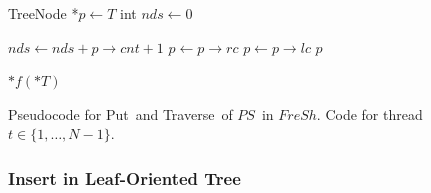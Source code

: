 \documentclass[a4paper,11pt,twoside,openany]{book}
\newcommand{\Put}{\mbox{\sc Put}}
\newcommand{\Traverse}{\mbox{\sc Traverse}}
\newcommand{\PS}{\mbox{$\mathit{PS}$}}
\newcommand{\Fresh}{\mbox{$\mathit{FreSh}$}}
\begin{document}
\begin{algorithm}[htbp]
\begin{algorithmic}[1]
    \vspace*{1mm}
      \label{alg:ps:help:c:treenode-start}
        \State TreeNode *$\mathit{p} \gets T$
        \State int $\mathit{nds} \gets 0$
    
                \State $\mathit{nds} \gets \mathit{nds + p \rightarrow cnt + 1}$
                \State $\mathit{p} \gets p \rightarrow rc$
            \Else
                \State $\mathit{p} \gets p \rightarrow lc$
            \EndIf
        \EndWhile
        \State \Return $\mathit{p}$ \label{alg:ps:help:c:treenode-end}
    \EndProcedure
    
    \vspace*{1mm}
            \State \Return
        \EndIf
        \State {}
            \State $*f(*T)$
        \EndIf
        \State {}
    \EndProcedure
    
    \end{algorithmic}
    
    \caption{Pseudocode for \Put\ and \Traverse\ of \PS\ in \Fresh. Code for thread $t \in \{ 1, \ldots, N-1\}$.}
    \label{alg:ps}
    \end{algorithm}


    \subsubsection{Insert in Leaf-Oriented Tree}
    \label{sec:leaf-oriented}
\end{document}
